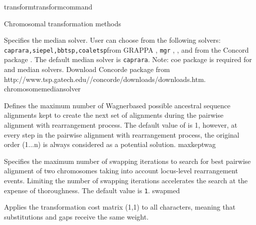 \begin{command}{transform}{transformcommand}
\begin{arguments}
\begin{argumentgroup}{Chromosomal transformation methods}
\begin{description}
                       {Specifies the median solver. User can choose from
                       the following solvers: \texttt {caprara,siepel,bbtsp,coaletsp}from GRAPPA \cite{baderetal2002},  
                       \texttt {mgr} \cite{bourqueandpevzner2002},  \cite{vinh2006}, and 
                       from the Concord package \cite{http://www.tsp.gatech.edu/concorde/}. The
                       default median solver is \texttt {caprara}. Note: coe package is required for  and 
                       median solvers. Download Concorde package from 
                       http://www.tsp.gatech.edu//concorde/downloads/downloads.htm.}
                       {chromosomemediansolver}

                        {Defines the maximum number of Wagner\-based possible ancestral sequence
                        alignments kept to create the next set of alignments during the pairwise alignment
                        with rearrangement process.  The default value of  is 1,
                        however, at every step in the pairwise alignment with rearrangement process, the original
                        order (1...n) is always considered as a potential solution.}
                        {maxkeptwag}
                        
                        
                        {Specifies the maximum number of swapping iterations
                        to search for best pairwise alignment of two chromosomes
                        taking into account locus-level rearrangement events. Limiting the number of swapping
                        iterations accelerates the search at the expense of
                        thoroughness. The default value is \texttt{1}.}
                        {swapmed}

       
            \end{description}
        \end{argumentgroup}
	\end{arguments}
	


	\begin{poyexamples} 
             	{Applies the transformation cost matrix (1,1) to all characters,
             	meaning that substitutions and gaps receive the same weight.}


\end{poyexamples}
\end{command}
